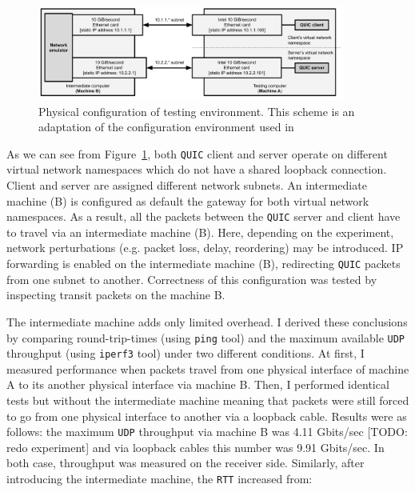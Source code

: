 \documentclass[12pt,a4paper,twoside,openright]{report}
\begin{document}
    \begin{figure}[ht]
    \centering
    \includegraphics[width=0.9\textwidth]{figs/Physical_testing_environment.png}
    \caption{Physical configuration of testing environment. This scheme is an adaptation of the configuration environment used in  \cite{Making_QUIC_Quicker}}
    \label{fig:Physical_testing_environment}
    \end{figure}
    
    As we can see from Figure~\ref{fig:Physical_testing_environment}, both \texttt{QUIC} client and server operate on different virtual network namespaces which do not have a shared loopback connection.
    Client and server are assigned different network subnets.
    An intermediate machine (B) is configured as default the gateway for both virtual network namespaces.
    As a result, all the packets between the \texttt{QUIC} server and client have to travel via an intermediate machine (B).
    Here, depending on the experiment, network perturbations (e.g. packet loss, delay, reordering) may be introduced.
    IP forwarding is enabled on the intermediate machine (B), redirecting \texttt{QUIC} packets from one subnet to another.
    Correctness of this configuration was tested by inspecting transit packets on the machine B.

    The intermediate machine adds only limited overhead.
    I derived these conclusions by comparing round-trip-times (using \texttt{ping} tool) and the maximum available \texttt{UDP} throughput (using \texttt{iperf3} tool) under two different conditions.
    At first, I measured performance when packets travel from one physical interface of machine A to its another physical interface via machine B.
    Then, I performed identical tests but without the intermediate machine meaning that packets were still forced to go from one physical interface to another via a loopback cable.
    Results were as follows: the maximum \texttt{UDP} throughput via machine B was 4.11 Gbits/sec [TODO: redo experiment] and via loopback cables this number was 9.91 Gbits/sec.
    In both case, throughput was measured on the receiver side.
    Similarly, after introducing the intermediate machine, the \texttt{RTT} increased from:
    
\end{document}

